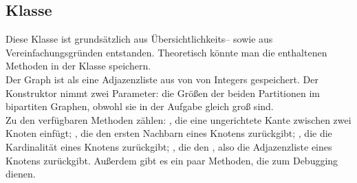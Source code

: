 \subsection{Klasse }
Diese Klasse ist grundsätzlich aus Übersichtlichkeits-- sowie aus Vereinfachungsgründen
entstanden. Theoretisch könnte man die enthaltenen Methoden in der Klasse  
speichern.\\

Der Graph ist als eine Adjazenzliste aus  von  von Integers gespeichert.
Der Konstruktor nimmt zwei Parameter: die Größen der beiden Partitionen
im bipartiten Graphen, obwohl sie in der Aufgabe gleich groß sind.\\

Zu den verfügbaren Methoden zählen: ,
die eine ungerichtete Kante zwischen zwei Knoten einfügt; , die den ersten Nachbarn eines Knotens zurückgibt; , die die Kardinalität
eines Knotens zurückgibt; , die den , also die Adjazenzliste
eines Knotens zurückgibt. Außerdem gibt es ein paar Methoden, die zum Debugging dienen. 
